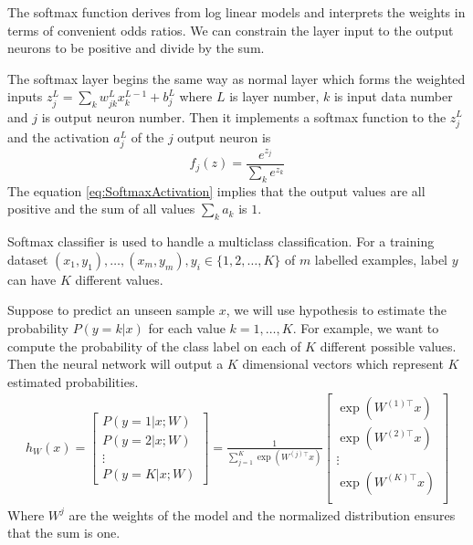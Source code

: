 The softmax function derives from log linear models and interprets the weights in terms of convenient odds ratios. We can constrain the layer input to the output neurons to be positive and divide by the sum.

The softmax layer begins the same way as normal layer which forms the weighted inputs $z^L_j = \sum_{k} w^L_{jk} x^{L-1}_k + b^L_j$ where $L$ is layer number, $k$ is input data number and $j$ is output neuron number. Then it implements a softmax function to the $z^L_j$ and the activation $a^L_j$ of the $j$ output neuron is
\begin{equation}\label{eq:SoftmaxActivation}
f_j(z) = \frac{e^{z_j}}{\sum_k e^{z_k}}
\end{equation}
The equation \ref{eq:SoftmaxActivation} implies that the output values are all positive and the sum of all values $\sum_k a_k$ is $1$.

Softmax classifier is used to handle a multiclass classification. For a training dataset $(x_{1}, y_{1}), \ldots, (x_{m}, y_{m}), y_{i} \in \{1, 2, \ldots, K\} $ of $m$ labelled examples, label $y$ can have $K$ different values.

Suppose to predict an unseen sample $x$, we will use hypothesis to estimate the probability $P(y=k | x)$ for each value $k = 1, \ldots, K$. For example, we want to compute the probability of the class label on each of $K$ different possible values. Then the neural network will output a $K$ dimensional vectors which represent $K$ estimated probabilities. 
\begin{align}
h_{W}(x) =
\begin{bmatrix}
P(y = 1 | x; W) \\
P(y = 2 | x; W) \\
\vdots \\
P(y = K | x; W)
\end{bmatrix}
=
\frac{1}{ \sum_{j=1}^{K}{\exp(W^{(j)\top} x) }}
\begin{bmatrix}
\exp(W^{(1)\top} x ) \\
\exp(W^{(2)\top} x ) \\
\vdots \\
\exp(W^{(K)\top} x ) \\
\end{bmatrix}
\end{align}
Where $W^{j}$ are the weights of the model and the normalized distribution ensures that the sum is one.

